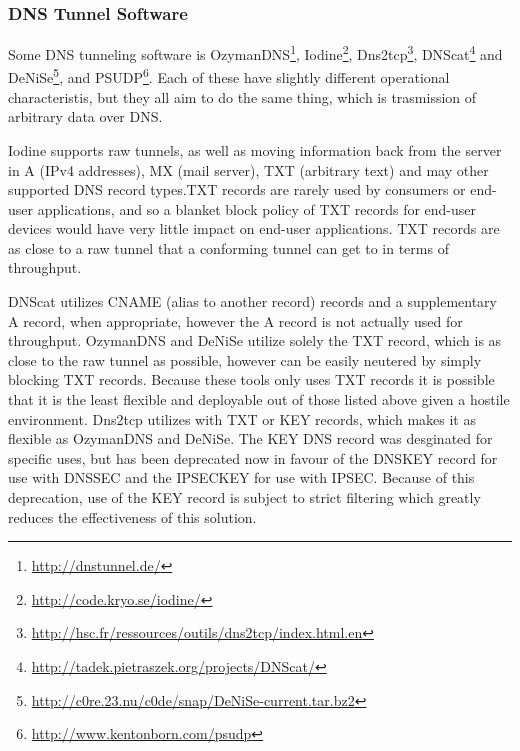 \documentclass{article}
\theoremstyle{remark}
\theoremstyle{definition}
\theoremstyle{definition}
\theoremstyle{definition}
\begin{document}
\subsubsection{DNS Tunnel Software}

Some DNS tunneling software is OzymanDNS\footnote{\url{http://dnstunnel.de/}},
Iodine\footnote{\url{http://code.kryo.se/iodine/}},
Dns2tcp\footnote{\url{http://hsc.fr/ressources/outils/dns2tcp/index.html.en}},
DNScat\footnote{\url{http://tadek.pietraszek.org/projects/DNScat/}} and
DeNiSe\footnote{\url{http://c0re.23.nu/c0de/snap/DeNiSe-current.tar.bz2}}, and
PSUDP\footnote{\url{http://www.kentonborn.com/psudp}}. Each of these have
slightly different operational characteristis, but they all aim to do the same
thing, which is trasmission of arbitrary data over DNS.

Iodine supports raw tunnels, as well as moving information back from the server
in A (IPv4 addresses), MX (mail server), TXT (arbitrary text) and may other
supported DNS record types.TXT records are rarely used by
consumers or end-user applications, and so a blanket block policy of TXT
records for end-user devices would have very little impact on end-user
applications. TXT records are as close to a raw tunnel that a conforming
tunnel can get to in terms of throughput.

DNScat utilizes CNAME (alias to
another record) records and a supplementary A record, when appropriate, however
the A record is not actually used for throughput. OzymanDNS and DeNiSe utilize
solely the
TXT record, which is as close to the raw tunnel as possible, however can be
easily neutered by simply blocking TXT records. Because these tools only uses
TXT records it is possible that it is the least flexible and deployable out of
those listed above given a hostile environment. Dns2tcp utilizes with TXT or
KEY records, which makes it as flexible as OzymanDNS and DeNiSe. The KEY DNS
record was desginated for specific uses\cite{ietf.rfc2931}, but has been
deprecated now\cite{ietf.rfc3445} in favour of the DNSKEY record for use with
DNSSEC\cite{ietf.rfc3755} and the IPSECKEY for use with
IPSEC\cite{ietf.rfc4025}. Because of this deprecation, use of the KEY record is
subject to strict filtering which greatly reduces the effectiveness of this
solution.
\end{document}

